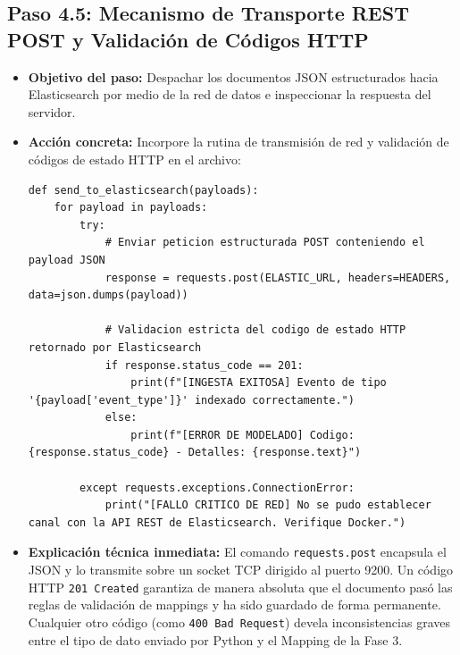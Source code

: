 \documentclass[
  coursetitle={Cómputo Nube y Tecnologías Emergentes},
  coursehours={96},
  coursedate={Verano 2026},
  doctype={Guía de Laboratorio Práctico},
  otherlangs={english,french},
  authorname={Lázaro},
  authorsurname={Bustio-Martínez},
  authortitle={PhD},
  role={Profesor Investigador},
  email={lbustio@inaoe.mx},
  phone={5559504000},
  ext={7459},
  institution={Instituto Nacional de Astrofísica, Óptica y Electrónica (INAOE)},
  department={Maestría en Ciencias en Tecnologías de Seguridad},
  address={Luis Enrique Erro 1, Sta. Ma. Tonantzintla, San Andrés Cholula, CP 72840, Puebla, México},
  margin={0.5in}
]{../../lbustio_lecture_notes}
\begin{document}
\subsection{Paso 4.5: Mecanismo de Transporte REST POST y Validación de Códigos HTTP}
\begin{itemize}
    \item \textbf{Objetivo del paso:} Despachar los documentos JSON estructurados hacia Elasticsearch por medio de la red de datos e inspeccionar la respuesta del servidor.
    \item \textbf{Acción concreta:} Incorpore la rutina de transmisión de red y validación de códigos de estado HTTP en el archivo:
\begin{verbatim}
def send_to_elasticsearch(payloads):
    for payload in payloads:
        try:
            # Enviar peticion estructurada POST conteniendo el payload JSON
            response = requests.post(ELASTIC_URL, headers=HEADERS, data=json.dumps(payload))
            
            # Validacion estricta del codigo de estado HTTP retornado por Elasticsearch
            if response.status_code == 201:
                print(f"[INGESTA EXITOSA] Evento de tipo '{payload['event_type']}' indexado correctamente.")
            else:
                print(f"[ERROR DE MODELADO] Codigo: {response.status_code} - Detalles: {response.text}")
                
        except requests.exceptions.ConnectionError:
            print("[FALLO CRITICO DE RED] No se pudo establecer canal con la API REST de Elasticsearch. Verifique Docker.")
\end{verbatim}
    \item \textbf{Explicación técnica inmediata:} El comando \texttt{requests.post} encapsula el JSON y lo transmite sobre un socket TCP dirigido al puerto 9200. Un código HTTP \texttt{201 Created} garantiza de manera absoluta que el documento pasó las reglas de validación de mappings y ha sido guardado de forma permanente. Cualquier otro código (como \texttt{400 Bad Request}) devela inconsistencias graves entre el tipo de dato enviado por Python y el Mapping de la Fase 3.
\end{itemize}
\end{document}

